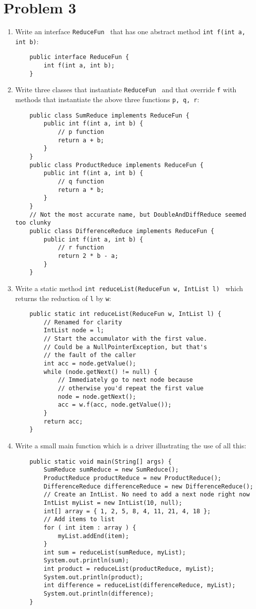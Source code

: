 \documentclass[12pt]{article}
\begin{document}
\section{Problem 3}
\begin{enumerate}[label=(\alph*)]
\item Write an interface {\tt ReduceFun } that has one abstract method {\tt int f(int a, int b)}:
  \begin{verbatim}
    public interface ReduceFun {
        int f(int a, int b);
    }
  \end{verbatim}
\item Write three classes that instantiate {\tt ReduceFun } and that override
  {\tt f} with methods that instantiate the above three functions {\tt p, q, r}:
  \begin{verbatim}
    public class SumReduce implements ReduceFun {
        public int f(int a, int b) {
            // p function
            return a + b;
        }
    }
    public class ProductReduce implements ReduceFun {
        public int f(int a, int b) {
            // q function
            return a * b;
        }
    }
    // Not the most accurate name, but DoubleAndDiffReduce seemed too clunky
    public class DifferenceReduce implements ReduceFun {
        public int f(int a, int b) {
            // r function
            return 2 * b - a;
        }
    }
  \end{verbatim}
\item Write a static method {\tt int reduceList(ReduceFun w, IntList l) } which returns the
  reduction of {\tt l} by {\tt w}:
  \begin{verbatim}
    public static int reduceList(ReduceFun w, IntList l) {
        // Renamed for clarity
        IntList node = l;
        // Start the accumulator with the first value.
        // Could be a NullPointerException, but that's
        // the fault of the caller
        int acc = node.getValue();
        while (node.getNext() != null) {
            // Immediately go to next node because
            // otherwise you'd repeat the first value
            node = node.getNext();
            acc = w.f(acc, node.getValue());
        }
        return acc;
    }
  \end{verbatim}
\item Write a small main function which is a driver illustrating the use of all this:
  \begin{verbatim}
    public static void main(String[] args) {
        SumReduce sumReduce = new SumReduce();
        ProductReduce productReduce = new ProductReduce();
        DifferenceReduce differenceReduce = new DifferenceReduce();
        // Create an IntList. No need to add a next node right now
        IntList myList = new IntList(10, null);
        int[] array = { 1, 2, 5, 8, 4, 11, 21, 4, 18 };
        // Add items to list
        for ( int item : array ) {
            myList.addEnd(item);
        }
        int sum = reduceList(sumReduce, myList);
        System.out.println(sum);
        int product = reduceList(productReduce, myList);
        System.out.println(product);
        int difference = reduceList(differenceReduce, myList);
        System.out.println(difference);
    }
  \end{verbatim}
\end{enumerate}
\end{document}
